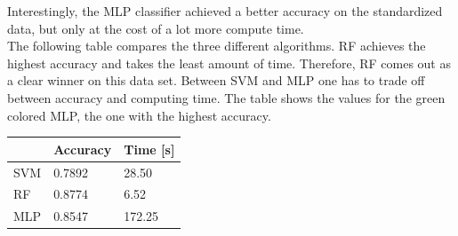 \documentclass[DIV=12, ngerman, fontsize=12pt, parskip=half]{scrreprt}
\begin{document}
	Interestingly, the MLP classifier achieved a better accuracy on the standardized data, but only at the cost of a lot more compute time.\\
	The following table compares the three different algorithms. RF achieves the highest accuracy and takes the least amount of time. Therefore, RF comes out as a clear winner on this data set. Between SVM and MLP one has to trade off between accuracy and computing time. The table shows the values for the green colored MLP, the one with the highest accuracy.
	
	\begin{table}[H]
		\begin{center}
			\begin{tabular}{|l|l|l|}
				\hline
							  & Accuracy & Time {[}s{]} \\ \hline
				SVM  		  & 0.7892   & 28.50        \\ \hline
				RF  	 	  & 0.8774   & 6.52         \\ \hline
				MLP 		  & 0.8547   & 172.25        \\ \hline
			\end{tabular}
		\end{center}
	\end{table}
	




	
\end{document}
